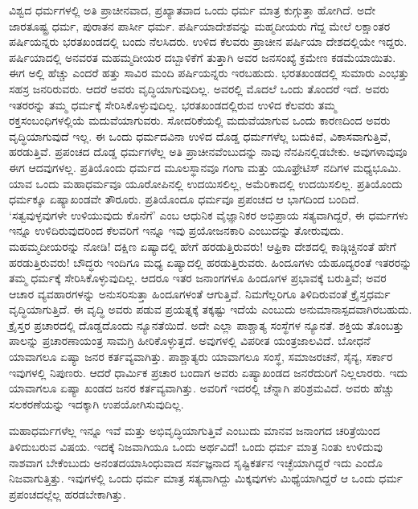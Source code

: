 
ವಿಶ್ವದ ಧರ್ಮಗಳಲ್ಲಿ ಅತಿ ಪ್ರಾಚೀನವಾದ, ಪ್ರಖ್ಯಾತವಾದ ಒಂದು ಧರ್ಮ ಮಾತ್ರ ಕುಗ್ಗುತ್ತಾ ಹೋಗಿದೆ. ಅದೇ ಜಾರತೂಷ್ಟ್ರ ಧರ್ಮ, ಪುರಾತನ ಪಾರ್ಸೀ ಧರ್ಮ. ಪರ್ಷಿಯಾದೇಶವನ್ನು ಮಹ್ಮದೀಯರು ಗೆದ್ದ ಮೇಲೆ ಲಕ್ಷಾಂತರ ಪರ್ಷಿಯನ್ನರು ಭರತಖಂಡದಲ್ಲಿ ಬಂದು ನೆಲಸಿದರು. ಉಳಿದ ಕೆಲವರು ಪ್ರಾಚೀನ ಪರ್ಷಿಯಾ ದೇಶದಲ್ಲಿಯೇ ಇದ್ದರು. ಪರ್ಷಿಯಾದಲ್ಲಿ ಅನವರತ ಮಹಮ್ಮದೀಯರ ದಬ್ಬಾಳಿಕೆಗೆ ತುತ್ತಾಗಿ ಅವರ ಜನಸಂಖ್ಯೆ ಕ್ರಮೇಣ ಕಡಮೆಯಾಯಿತು. ಈಗ ಅಲ್ಲಿ ಹೆಚ್ಚು ಎಂದರೆ ಹತ್ತು ಸಾವಿರ ಮಂದಿ ಪರ್ಷಿಯನ್ನರು ಇರಬಹುದು. ಭರತಖಂಡದಲ್ಲಿ ಸುಮಾರು ಎಂಭತ್ತು ಸಹಸ್ರ ಜನರಿರುವರು. ಆದರೆ ಅವರು ವೃದ್ಧಿಯಾಗುವುದಿಲ್ಲ. ಅವರಲ್ಲಿ ಮೊದಲೆ ಒಂದು ತೊಂದರೆ ಇದೆ. ಅವರು ಇತರರನ್ನು ತಮ್ಮ ಧರ್ಮಕ್ಕೆ ಸೇರಿಸಿಕೊಳ್ಳುವುದಿಲ್ಲ. ಭರತಖಂಡದಲ್ಲಿರುವ ಉಳಿದ ಕೆಲವರು ತಮ್ಮ ರಕ್ತಸಂಬಂಧಿಗಳಲ್ಲಿಯೆ ಮದುವೆಯಾಗುವರು. ಸೋದರಿಕೆಯಲ್ಲಿ ಮದುವೆಯಾಗುವ ಒಂದು ಕಾರಣದಿಂದ ಅವರು ವೃದ್ಧಿಯಾಗುವುದೆ ಇಲ್ಲ. ಈ ಒಂದು ಧರ್ಮದವಿನಾ ಉಳಿದ ದೊಡ್ಡ ಧರ್ಮಗಳೆಲ್ಲ ಬದುಕಿವೆ, ವಿಕಾಸವಾಗುತ್ತಿವೆ, ಹರಡುತ್ತಿವೆ. ಪ್ರಪಂಚದ ದೊಡ್ಡ ಧರ್ಮಗಳೆಲ್ಲ ಅತಿ ಪ್ರಾಚೀನವೆಂಬುದನ್ನು ನಾವು ನೆನಪಿನಲ್ಲಿಡಬೇಕು. ಅವುಗಳಾವುವೂ ಈಗ ಆದವುಗಳಲ್ಲ. ಪ್ರತಿಯೊಂದು ಧರ್ಮದ ಮೂಲಸ್ಥಾನವೂ ಗಂಗಾ ಮತ್ತು ಯೂಫ್ರೇಟಿಸ್​ ನದಿಗಳ ಮಧ್ಯಭೂಮಿ. ಯಾವ ಒಂದು ಮಹಾಧರ್ಮವೂ ಯೂರೋಪಿನಲ್ಲಿ ಉದಯಿಸಲಿಲ್ಲ, ಅಮೆರಿಕಾದಲ್ಲಿ ಉದಯಿಸಲಿಲ್ಲ. ಪ್ರತಿಯೊಂದು ಧರ್ಮಕ್ಕೂ ಏಷ್ಯಾಖಂಡವೇ ತೌರೂರು. ಪ್ರತಿಯೊಂದೂ ಧರ್ಮವೂ ಪ್ರಪಂಚದ ಆ ಭಾಗದಿಂದ ಬಂದಿದೆ. ‘ಸತ್ವವುಳ್ಳವುಗಳೇ ಉಳಿಯುವುದು ಕೊನೆಗೆ’ ಎಂಬ ಆಧುನಿಕ ವೈಜ್ಞಾನಿಕರ ಅಭಿಪ್ರಾಯ ಸತ್ಯವಾಗಿದ್ದರೆ, ಈ ಧರ್ಮಗಳು ಇನ್ನೂ ಉಳಿದಿರುವುದರಿಂದ ಕೆಲವರಿಗೆ ಇನ್ನೂ ಇವು ಪ್ರಯೋಜನಕಾರಿ ಎಂಬುದನ್ನು ತೋರುವುದು. ಮಹಮ್ಮದೀಯರನ್ನು ನೋಡಿ! ದಕ್ಷಿಣ ಏಷ್ಯಾದಲ್ಲಿ ಹೇಗೆ ಹರಡುತ್ತಿರುವರು! ಆಫ್ರಿಕಾ ದೇಶದಲ್ಲಿ ಕಾಡ್ಗಿಚ್ಚಿನಂತೆ ಹೇಗೆ ಹರಡುತ್ತಿರುವರು! ಬೌದ್ಧರು ಇಂದಿಗೂ ಮಧ್ಯ ಏಷ್ಯಾದಲ್ಲಿ ಹರಡುತ್ತಿರುವರು. ಹಿಂದೂಗಳು ಯೆಹೂದ್ಯರಂತೆ ಇತರರನ್ನು ತಮ್ಮ ಧರ್ಮಕ್ಕೆ ಸೇರಿಸಿಕೊಳ್ಳುವುದಿಲ್ಲ. ಆದರೂ ಇತರ ಜನಾಂಗಗಳೂ ಹಿಂದೂಗಳ ಪ್ರಭಾವಕ್ಕೆ ಬರುತ್ತಿವೆ; ಅವರ ಆಚಾರ ವ್ಯವಹಾರಗಳನ್ನು ಅನುಸರಿಸುತ್ತಾ ಹಿಂದೂಗಳಂತೆ ಆಗುತ್ತಿವೆ. ನಿಮಗೆಲ್ಲರಿಗೂ ತಿಳಿದಿರುವಂತೆ ಕ್ರೈಸ್ತಧರ್ಮ ವೃದ್ಧಿಯಾಗುತ್ತಿದೆ. ಈ ವೃದ್ಧಿ ಅವರು ಪಡುವ ಪ್ರಯತ್ನಕ್ಕೆ ತಕ್ಕಷ್ಟು ಇದೆಯೆ ಎಂಬುದು ಅನುಮಾನಾಸ್ಪದವಾಗಿರಬಹುದು. ಕ್ರೈಸ್ತರ ಪ್ರಚಾರದಲ್ಲಿ ದೊಡ್ಡದೊಂದು ನ್ಯೂನತೆಯಿದೆ. ಅದೇ ಎಲ್ಲಾ ಪಾಶ್ಚಾತ್ಯ ಸಂಸ್ಥೆಗಳ ನ್ಯೂನತೆ. ಶಕ್ತಿಯ ತೊಂಬತ್ತು ಪಾಲನ್ನು ಪ್ರಚಾರಣಾಯಂತ್ರ ಸಾಮಗ್ರಿ ಹೀರಿಕೊಳ್ಳುತ್ತದೆ. ಅವುಗಳಲ್ಲಿ ವಿಪರೀತ ಯಂತ್ರಜಾಲವಿದೆ. ಬೋಧನೆ ಯಾವಾಗಲೂ ಏಷ್ಯಾ ಜನರ ಕರ್ತವ್ಯವಾಗಿತ್ತು. ಪಾಶ್ಚಾತ್ಯರು ಯಾವಾಗಲೂ ಸಂಸ್ಥೆ, ಸಮಾಜರಚನೆ, ಸೈನ್ಯ, ಸರ್ಕಾರ ಇವುಗಳಲ್ಲಿ ನಿಪುಣರು. ಆದರೆ ಧಾರ್ಮಿಕ ಪ್ರಚಾರ ಬಂದಾಗ ಅವರು ಏಷ್ಯಾಖಂಡದ ಜನರೆದುರಿಗೆ ನಿಲ್ಲಲಾರರು. ಇದು ಯಾವಾಗಲೂ ಏಷ್ಯಾ ಖಂಡದ ಜನರ ಕರ್ತವ್ಯವಾಗಿತ್ತು. ಅವರಿಗೆ ಇದರಲ್ಲಿ ಚೆನ್ನಾಗಿ ಪರಿಶ್ರಮವಿದೆ. ಅವರು ಹೆಚ್ಚು ಸಲಕರಣೆಯನ್ನು ಇದಕ್ಕಾಗಿ ಉಪಯೋಗಿಸುವುದಿಲ್ಲ.


ಮಹಾಧರ್ಮಗಳೆಲ್ಲ ಇನ್ನೂ ಇವೆ ಮತ್ತು ಅಭಿವೃದ್ಧಿಯಾಗುತ್ತಿವೆ ಎಂಬುದು ಮಾನವ ಜನಾಂಗದ ಚರಿತ್ರೆಯಿಂದ ತಿಳಿದುಬರುವ ವಿಷಯ. ಇದಕ್ಕೆ ನಿಜವಾಗಿಯೂ ಒಂದು ಅರ್ಥವಿದೆ! ಒಂದು ಧರ್ಮ ಮಾತ್ರ ನಿಂತು ಉಳಿದುವು ನಾಶವಾಗ ಬೇಕೆಂಬುದು ಅನಂತದಯಾಸಿಂಧುವಾದ ಸರ್ವಜ್ಞನಾದ ಸೃಷ್ಟಿಕರ್ತನ ಇಚ್ಛೆಯಾಗಿದ್ದರೆ ಇದು ಎಂದೊ ನಿಜವಾಗುತ್ತಿತ್ತು. ಇವುಗಳಲ್ಲಿ ಒಂದು ಧರ್ಮ ಮಾತ್ರ ಸತ್ಯವಾಗಿದ್ದು ಮಿಕ್ಕವುಗಳು ಮಿಥ್ಯೆಯಾಗಿದ್ದರೆ ಆ ಒಂದು ಧರ್ಮ ಪ್ರಪಂಚದಲ್ಲೆಲ್ಲ ಹರಡಬೇಕಾಗಿತ್ತು.

